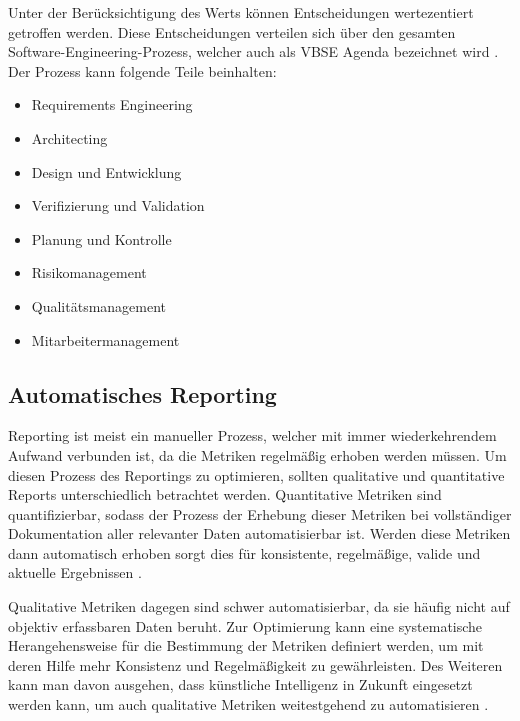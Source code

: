 Unter der Berücksichtigung des Werts können Entscheidungen wertezentiert getroffen werden. Diese Entscheidungen verteilen sich über den gesamten Software-Engineering-Prozess, welcher auch  als VBSE Agenda bezeichnet wird \cite{}.
Der Prozess kann folgende Teile beinhalten:
\begin{itemize}
  \item Requirements Engineering
  \item Architecting
  \item Design und Entwicklung
  \item Verifizierung und Validation
  \item Planung und Kontrolle
  \item Risikomanagement
  \item Qualitätsmanagement
  \item Mitarbeitermanagement
\end{itemize}


\subsection{Automatisches Reporting}
Reporting ist meist ein manueller Prozess, welcher mit immer wiederkehrendem Aufwand verbunden ist, da die Metriken regelmäßig erhoben werden müssen. Um diesen Prozess des Reportings zu optimieren, sollten qualitative und quantitative Reports unterschiedlich betrachtet werden.
Quantitative Metriken sind quantifizierbar, sodass der Prozess der Erhebung dieser Metriken bei vollständiger Dokumentation aller relevanter Daten automatisierbar ist. Werden diese Metriken dann automatisch erhoben sorgt dies für konsistente, regelmäßige, valide und aktuelle Ergebnissen \cite{}.

Qualitative Metriken dagegen sind schwer automatisierbar, da sie häufig nicht auf objektiv erfassbaren Daten beruht. Zur Optimierung kann eine systematische Herangehensweise für die Bestimmung der Metriken definiert werden, um mit deren Hilfe  mehr Konsistenz und Regelmäßigkeit zu gewährleisten. Des Weiteren kann man davon ausgehen, dass künstliche Intelligenz in Zukunft eingesetzt werden kann, um auch qualitative Metriken weitestgehend zu automatisieren \cite{}.

